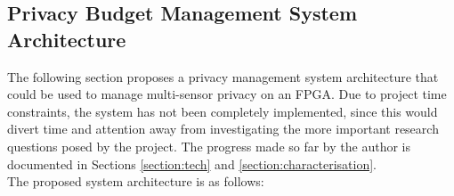 \documentclass[12pt]{article}
\begin{document}
  \subsection{Privacy Budget Management System Architecture} \label{subsection:privacy_budget_system_arch}
    The following section proposes a privacy management system architecture that could be used to manage multi-sensor privacy on an FPGA. Due to project time constraints, the system has not been completely implemented, since this would divert time and attention away from investigating the more important research questions posed by the project. The progress made so far by the author is documented in Sections \ref{section:tech} and \ref{section:characterisation}.\\

    The proposed system architecture is as follows:
\end{document}
